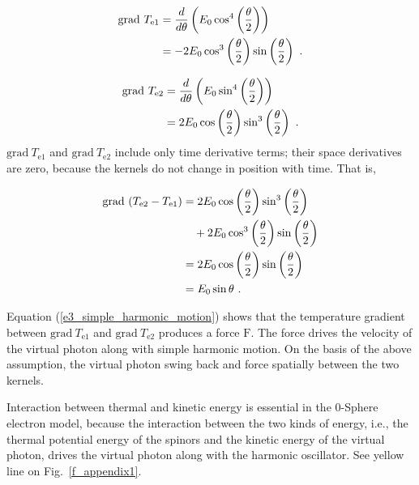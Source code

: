 \documentclass[%
 reprint,
 amsmath,amssymb,
 aps,
]{revtex4-1}
\numberwithin{equation}{section}%
\begin{document}
\begin{align}
    \mathrm{grad} \ T_{\mathrm{e1}}
                &= \frac{d}{d \theta} \left( E_{0} \cos^{4} \left( \frac{\theta}{2} \right) \right) \notag \\
        &= - 2 E_{0} \cos^{3} \left( \frac{\theta}{2} \right) \sin \left( \frac{\theta}{2} \right)
        \ .
        \label{e3_gradT_e1}
\end{align}

\begin{align}
    \mathrm{grad} \ T_{\mathrm{e2}}
        &= \frac{d}{d \theta} \left( E_{0} \sin^{4} \left( \frac{\theta}{2} \right) \right) \notag \\
        &=   2 E_{0} \cos \left( \frac{\theta}{2} \right) \sin^{3} \left( \frac{\theta}{2} \right)
        \ .
        \label{e3_gradT_e2}
\end{align}        
$\mathrm{grad} \ T_{\mathrm{e1}}$ and $\mathrm{grad} \ T_{\mathrm{e2}}$ include only time derivative terms; their space derivatives are zero, because the kernels do not change in position with time. That is,

        \begin{align}
            \mathrm{grad} \ (T_{\mathrm{e2}} - T_{\mathrm{e1}})
                &= 2 E_{0} \cos \left( \frac{\theta}{2} \right) \sin^{3} \left( \frac{\theta}{2} \right) \notag \\
                & \quad + 2 E_{0} \cos^{3} \left( \frac{\theta}{2} \right) \sin \left( \frac{\theta}{2} \right) \notag \\
                &= 2 E_{0} \cos \left( \frac{\theta}{2} \right) \sin \left( \frac{\theta}{2} \right) \notag \\
                &= E_{0} \sin \theta
                \ .
            \label{e3_simple_harmonic_motion}
        \end{align}


Equation (\ref{e3_simple_harmonic_motion}) shows that the temperature gradient between $\mathrm{grad} \ T_{\mathrm{e1}}$ and $\mathrm{grad} \ T_{\mathrm{e2}}$ produces a force $\bm{\mathrm{F}}$. The force drives the velocity of the virtual photon along with simple harmonic motion. On the basis of the above assumption, the virtual photon swing back and force spatially between the two kernels.
    
Interaction between thermal and kinetic energy is essential in the 0-Sphere electron model, because the interaction between the two kinds of energy, i.e., the thermal potential energy of the spinors and the kinetic energy of the virtual photon, drives the virtual photon along with the harmonic oscillator. See yellow line on Fig.~\ref{f_appendix1}.
\end{document}
